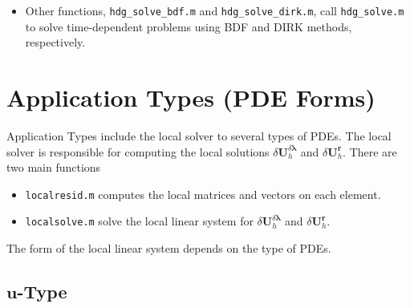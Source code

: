 \documentclass[11pt]{article}
\begin{document}
\begin{itemize}
\begin{equation}
\begin{array}{rcl}
\mathbb{J}_F & = & \displaystyle \left\langle \Big( \frac{\partial \bm{\widehat{F}}^b(\overline{\bm{U}}_h,\overline{\widehat{\bm{u}}}_h)}{\partial {\bm{U}}_h} \delta {\bm{U}}^{\delta \bm{\lambda}}_h + \frac{\partial \bm{\widehat{F}}^b(\overline{\bm{U}}_h,\overline{\widehat{\bm{u}}}_h)}{\partial \widehat{\bm{u}}_h} \delta \widehat{\bm{u}}_h  \Big) \cdot \bm{n}, \bm{\mu} \right\rangle_{F}, \\[3ex]
\mathbb{R}_F & = &  \displaystyle  -\left\langle \bm{\widehat{F}}^b (\overline{\bm{U}}_h,\overline{\widehat{\bm{u}}}_h) \cdot \bm{n} - \bm{g}, \bm{\mu} \right\rangle_{F} - \left\langle \Big( \frac{\partial \bm{\widehat{F}}^b(\overline{\bm{U}}_h,\overline{\widehat{\bm{u}}}_h)}{\partial {\bm{U}}_h} \delta {\bm{U}}^{\bm{r}}_h  \Big) \cdot \bm{n}, \bm{\mu} \right\rangle_{F} .
\end{array}
\end{equation}
Here $\delta {\bm{U}}^{\delta \bm{\lambda}}_h$ and $\delta {\bm{U}}^{\bm{r}}_h$ are local solutions which are computed in \texttt{localsolve.m}.\footnote{Need to move the call to \texttt{fbou.m} and \texttt{fhat.m} from \texttt{elemmat.m} to \texttt{localsolve.m}}
\item Other functions, \texttt{hdg\_solve\_bdf.m} and \texttt{hdg\_solve\_dirk.m}, call \texttt{hdg\_solve.m} to solve time-dependent problems using BDF and DIRK methods, respectively.
\end{itemize} 

\section{Application Types (PDE Forms)}

Application Types include the local solver to several types of PDEs. The local solver is responsible for computing the local solutions  $\delta {\bm{U}}^{\delta \bm{\lambda}}_h$ and $\delta {\bm{U}}^{\bm{r}}_h$. There are two main functions

\begin{itemize}
\item \texttt{localresid.m} computes the local matrices and vectors on each element.
\item \texttt{localsolve.m} solve the local linear system for $\delta {\bm{U}}^{\delta \bm{\lambda}}_h$ and $\delta {\bm{U}}^{\bm{r}}_h$. 
\end{itemize}

The form of the local linear system depends on the type of PDEs. 

\subsection{$\bm{u}$-Type}
\end{document}
